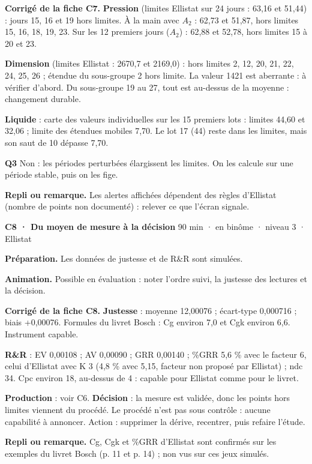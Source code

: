 \textbf{\color{ok}Corrigé de la fiche C7.} \textbf{Pression} (limites Ellistat sur 24 jours : 63,16 et 51,44) : jours 15, 16 et 19 hors limites. À la main avec $A_2$ : 62,73 et 51,87, hors limites 15, 16, 18, 19, 23. Sur les 12 premiers jours ($A_2$) : 62,88 et 52,78, hors limites 15 à 20 et 23.\par \textbf{Dimension} (limites Ellistat : 2670,7 et 2169,0) : hors limites 2, 12, 20, 21, 22, 24, 25, 26 ; étendue du sous-groupe 2 hors limite. La valeur 1421 est aberrante : à vérifier d'abord. Du sous-groupe 19 au 27, tout est au-dessus de la moyenne : changement durable.\par \textbf{Liquide} : carte des valeurs individuelles sur les 15 premiers lots : limites 44,60 et 32,06 ; limite des étendues mobiles 7,70. Le lot 17 (44) reste dans les limites, mais son saut de 10 dépasse 7,70.\par \textbf{Q3} Non : les périodes perturbées élargissent les limites. On les calcule sur une période stable, puis on les fige.\par
{\small\textbf{Repli ou remarque.} Les alertes affichées dépendent des règles d'Ellistat (nombre de points non documenté) : relever ce que l'écran signale.}\par
\vspace{3pt}
\begin{tcolorbox}[act]\textbf{C8 · Du moyen de mesure à la décision} \hfill {\small 90 min · en binôme · niveau 3 · Ellistat}\end{tcolorbox}
\textbf{Préparation.} Les données de justesse et de R\&R sont simulées.\par
\textbf{Animation.} Possible en évaluation : noter l'ordre suivi, la justesse des lectures et la décision.\par
\textbf{\color{ok}Corrigé de la fiche C8.} \textbf{Justesse} : moyenne 12,00076 ; écart-type 0,000716 ; biais +0,00076. Formules du livret Bosch : Cg environ 7,0 et Cgk environ 6,6. Instrument capable.\par \textbf{R\&R} : EV 0,00108 ; AV 0,00090 ; GRR 0,00140 ; \%GRR 5,6 \% avec le facteur 6, celui d'Ellistat avec K 3 (4,8 \% avec 5,15, facteur non proposé par Ellistat) ; ndc 34. Cpc environ 18, au-dessus de 4 : capable pour Ellistat comme pour le livret.\par \textbf{Production} : voir C6. \textbf{Décision} : la mesure est validée, donc les points hors limites viennent du procédé. Le procédé n'est pas sous contrôle : aucune capabilité à annoncer. Action : supprimer la dérive, recentrer, puis refaire l'étude.\par
{\small\textbf{Repli ou remarque.} Cg, Cgk et \%GRR d'Ellistat sont confirmés sur les exemples du livret Bosch (p. 11 et p. 14) ; non vus sur ces jeux simulés.}\par
\vspace{3pt}

